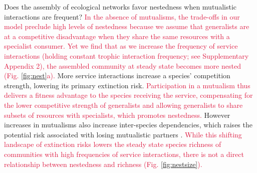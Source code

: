 \documentclass[twocolumn,preprintnumbers,amsmath,amssymb,superscriptaddress,linenumbers]{revtex4-1}
\newcommand{\rev}[1]{\textcolor{crimson}{#1}}
\begin{document}
Does the assembly of ecological networks favor nestedness when mutualistic interactions are frequent?
\rev{In the absence of mutualisms, the trade-offs in our model preclude high levels of nestedness because we assume that generalists are at a competitive disadvantage when they share the same resources with a specialist consumer.
Yet we find that as we increase the frequency of service interactions (holding constant trophic interaction frequency; see Supplementary Appendix 2), the assembled community at steady state becomes more nested (Fig. \ref{fig:nest}a).
}
More service interactions increase a species' competition strength, lowering its primary extinction risk.
\rev{Participation in a mutualism thus delivers a fitness advantage to the species receiving the service, compensating for the lower competitive strength of generalists and allowing generalists to share subsets of resources with specialists, which promotes nestedness.}
However increases in mutualisms also increase inter-species dependencies, which raises the potential risk associated with losing mutualistic partners \cite{Bond1994,Colwell2012}. %
\rev{While this shifting landscape of extinction risks lowers the steady state species richness of communities with high frequencies of service interactions, there is not a direct relationship between nestedness and richness (Fig. \ref{fig:nestsize}).}

% 
\end{document}
